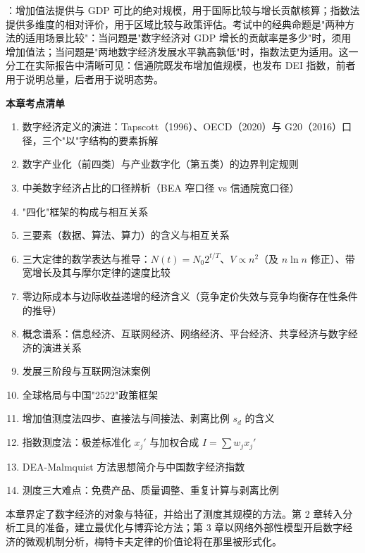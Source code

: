 ：增加值法提供与 GDP 可比的绝对规模，用于国际比较与增长贡献核算；指数法提供多维度的相对评价，用于区域比较与政策评估。考试中的经典命题是"两种方法的适用场景比较"：当问题是"数字经济对 GDP 增长的贡献率是多少"时，须用增加值法；当问题是"两地数字经济发展水平孰高孰低"时，指数法更为适用。这一分工在实际报告中清晰可见：信通院既发布增加值规模，也发布 DEI 指数，前者用于说明总量，后者用于说明态势。

\begin{chapterbox}
\textbf{本章考点清单}

\begin{enumerate}
\item 数字经济定义的演进：Tapscott（1996）、OECD（2020）与 G20（2016）口径，三个"以"字结构的要素拆解 
\item 数字产业化（前四类）与产业数字化（第五类）的边界判定规则 
\item 中美数字经济占比的口径辨析（BEA 窄口径 vs 信通院宽口径）
\item "四化"框架的构成与相互关系 
\item 三要素（数据、算法、算力）的含义与相互关系 
\item 三大定律的数学表达与推导：$N(t)=N_0 2^{t/T}$、$V\propto n^2$（及 $n\ln n$ 修正）、带宽增长及其与摩尔定律的速度比较 
\item 零边际成本与边际收益递增的经济含义（竞争定价失效与竞争均衡存在性条件的推导） 
\item 概念谱系：信息经济、互联网经济、网络经济、平台经济、共享经济与数字经济的演进关系 
\item 发展三阶段与互联网泡沫案例 
\item 全球格局与中国"2522"政策框架 
\item 增加值测度法四步、直接法与间接法、剥离比例 $s_d$ 的含义 
\item 指数测度法：极差标准化 $x_j'$ 与加权合成 $I=\sum w_j x_j'$ 
\item DEA-Malmquist 方法思想简介与中国数字经济指数 
\item 测度三大难点：免费产品、质量调整、重复计算与剥离比例 
\end{enumerate}
\end{chapterbox}

本章界定了数字经济的对象与特征，并给出了测度其规模的方法。第 2 章转入分析工具的准备，建立最优化与博弈论方法；第 3 章以网络外部性模型开启数字经济的微观机制分析，梅特卡夫定律的价值论将在那里被形式化。
